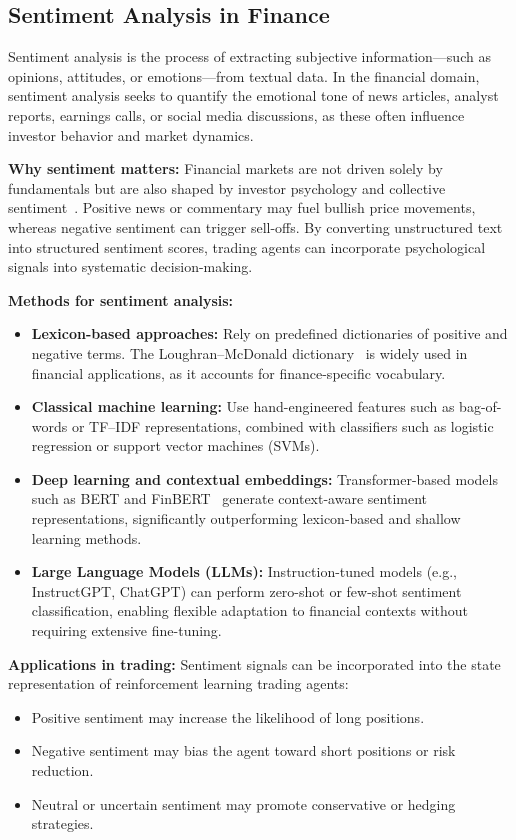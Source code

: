 \documentclass[12pt,a4paper]{report}
\begin{document}
\subsection{Sentiment Analysis in Finance}

Sentiment analysis is the process of extracting subjective information—such as opinions, attitudes, or emotions—from textual data. In the financial domain, sentiment analysis seeks to quantify the emotional tone of news articles, analyst reports, earnings calls, or social media discussions, as these often influence investor behavior and market dynamics.

\bigskip
\textbf{Why sentiment matters:}  
Financial markets are not driven solely by fundamentals but are also shaped by investor psychology and collective sentiment~\cite{tetlock2007giving}. Positive news or commentary may fuel bullish price movements, whereas negative sentiment can trigger sell-offs. By converting unstructured text into structured sentiment scores, trading agents can incorporate psychological signals into systematic decision-making.

\bigskip
\textbf{Methods for sentiment analysis:}
\begin{itemize}
    \item \textbf{Lexicon-based approaches:} Rely on predefined dictionaries of positive and negative terms. The Loughran–McDonald dictionary~\cite{loughran2011liability} is widely used in financial applications, as it accounts for finance-specific vocabulary.
    \item \textbf{Classical machine learning:} Use hand-engineered features such as bag-of-words or TF–IDF representations, combined with classifiers such as logistic regression or support vector machines (SVMs).
    \item \textbf{Deep learning and contextual embeddings:} Transformer-based models such as BERT and FinBERT~\cite{araci2019finbert} generate context-aware sentiment representations, significantly outperforming lexicon-based and shallow learning methods.
    \item \textbf{Large Language Models (LLMs):} Instruction-tuned models (e.g., InstructGPT, ChatGPT) can perform zero-shot or few-shot sentiment classification, enabling flexible adaptation to financial contexts without requiring extensive fine-tuning.
\end{itemize}

\bigskip
\textbf{Applications in trading:}  
Sentiment signals can be incorporated into the state representation of reinforcement learning trading agents:
\begin{itemize}
    \item Positive sentiment may increase the likelihood of long positions.
    \item Negative sentiment may bias the agent toward short positions or risk reduction.
    \item Neutral or uncertain sentiment may promote conservative or hedging strategies.
\end{itemize}
\end{document}
